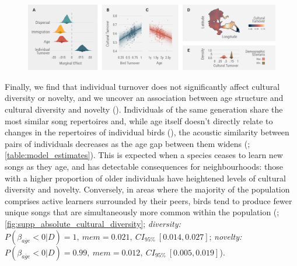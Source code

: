 \documentclass[9pt, twocolumn, twoside]{gsajnl}
\begin{document}
\begin{figure}[!htb]
    \centering
    \includegraphics[width=\linewidth]{figures/chapter_4/FIG4.pdf}
    \label{c4_fig:turnover}
\end{figure}

Finally, we find that individual turnover does not significantly affect cultural diversity or novelty, and we uncover an association between age structure and cultural diversity and novelty (). Individuals of the same generation share the most similar song repertoires and, while age itself doesn't directly relate to changes in the repertoires of individual birds (), the acoustic similarity between pairs of individuals decreases as the age gap between them widens (; \autoref{table:model_estimates}). This is expected when a species ceases to learn new songs as they age, and has detectable consequences for neighbourhoods: those with a higher proportion of older individuals have heightened levels of cultural diversity and novelty. Conversely, in areas where the majority of the population comprises active learners surrounded by their peers, birds tend to produce fewer unique songs that are simultaneously more common within the population (; \autoref{fig:supp_absolute_cultural_diversity}; \textit{diversity:} $P(\beta_{\overline{age}} < 0 | D) = 1,~mem=0.021,~CI_{95\%}~[0.014, 0.027]$; \textit{novelty:} $P(\beta_{\overline{age}} < 0 | D) = 0.99,~mem=0.012,~CI_{95\%}~[0.005, 0.019]$).
\end{document}
